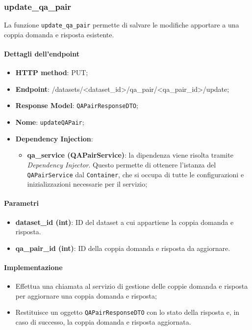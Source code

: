 \subsubsection{update\_qa\_pair}
La funzione \texttt{update\_qa\_pair} permette di salvare le modifiche apportare a una coppia domanda e risposta esistente.
\paragraph{Dettagli dell'endpoint}
\begin{itemize}
    \item \textbf{HTTP method}: PUT;
    \item \textbf{Endpoint}: /datasets/\textless dataset\_id\textgreater/qa\_pair/\textless qa\_pair\_id\textgreater/update;
    \item \textbf{Response Model}: \texttt{QAPairResponseDTO};
    \item \textbf{Nome}: \texttt{updateQAPair};
    \item \textbf{Dependency Injection}: 
    \begin{itemize}
        \item \textbf{qa\_service (QAPairService)}: la dipendenza viene risolta tramite \textit{Dependency Injector}. Questo permette di ottenere l'istanza del \texttt{QAPairService} dal \texttt{Container}, che si occupa di tutte le configurazioni e inizializzazioni necessarie per il servizio;
    \end{itemize}
\end{itemize}

\paragraph{Parametri}
\begin{itemize}
    \item \textbf{dataset\_id (int)}: ID del dataset a cui appartiene la coppia domanda e risposta.
    \item \textbf{qa\_pair\_id (int)}: ID della coppia domanda e risposta da aggiornare.
\end{itemize}
\paragraph{Implementazione}
\begin{itemize}
    \item Effettua una chiamata al servizio di gestione delle coppie domanda e risposta per aggiornare una coppia domanda e risposta;
    \item Restituisce un oggetto \texttt{QAPairResponseDTO} con lo stato della risposta e, in caso di successo, la coppia domanda e risposta aggiornata.
\end{itemize}

